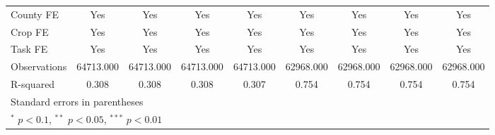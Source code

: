 \documentclass[12pt]{article}
\newcommand{\sym}[1]{\ensuremath{^{#1}}}
\begin{document}
\begin{appendices}
\begin{table}[h!]
\begin{tabular}{l*{8}{c}}
County FE           &         Yes         &         Yes         &         Yes         &         Yes         &         Yes         &         Yes         &         Yes         &         Yes         \\
Crop FE             &         Yes         &         Yes         &         Yes         &         Yes         &         Yes         &         Yes         &         Yes         &         Yes         \\
Task FE             &         Yes         &         Yes         &         Yes         &         Yes         &         Yes         &         Yes         &         Yes         &         Yes         \\
Observations        &   64713.000         &   64713.000         &   64713.000         &   64713.000         &   62968.000         &   62968.000         &   62968.000         &   62968.000         \\
R-squared           &       0.308         &       0.308         &       0.308         &       0.307         &       0.754         &       0.754         &       0.754         &       0.754         \\
\hline\hline
\multicolumn{9}{l}{\footnotesize Standard errors in parentheses}\\
\multicolumn{9}{l}{\footnotesize \sym{*} \(p<0.1\), \sym{**} \(p<0.05\), \sym{***} \(p<0.01\)}\\
\end{tabular}
\end{table}


\end{appendices}
\end{document}
